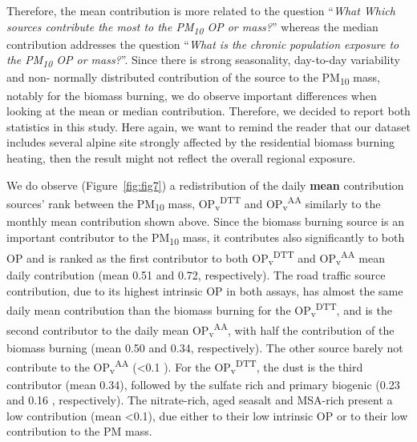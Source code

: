 \documentclass[acp]{copernicus}
\begin{document}
Therefore, the mean contribution is more related to the question
``\emph{What Which sources contribute the most to the
PM\textsubscript{10} OP or mass?}'' whereas the median contribution
addresses the question ``\emph{What is the} \emph{chronic}
\emph{population exposure to the PM\textsubscript{10} OP or mass?}''.
Since there is strong seasonality, day-to-day variability and non-
normally distributed contribution of the source to the
PM\textsubscript{10} mass, notably for the biomass burning, we do
observe important differences when looking at the mean or median
contribution. Therefore, we decided to report both statistics in this
study. Here again, we want to remind the reader that our dataset
includes several alpine site strongly affected by the residential
biomass burning heating, then the result might not reflect the overall
regional exposure.

We do observe (Figure~\ref{fig:fig7}) a
redistribution of the daily \textbf{mean} contribution sources' rank
between the PM\textsubscript{10} mass,
OP\textsubscript{v}\textsuperscript{DTT} and
OP\textsubscript{v}\textsuperscript{AA} similarly to the monthly mean
contribution shown above. Since the biomass burning source is an
important contributor to the PM\textsubscript{10} mass, it contributes
also significantly to both OP and is ranked as the first contributor to
both OP\textsubscript{v}\textsuperscript{DTT} and
OP\textsubscript{v}\textsuperscript{AA} mean daily contribution (mean
0.51 and 0.72, respectively). The road traffic source contribution, due
to its highest intrinsic OP in both assays, has almost the same daily
mean contribution than the biomass burning for the
OP\textsubscript{v}\textsuperscript{DTT}, and is the second contributor
to the daily mean OP\textsubscript{v}\textsuperscript{AA}, with half the
contribution of the biomass burning (mean 0.50 and 0.34, respectively).
The other source barely not contribute to the
OP\textsubscript{v}\textsuperscript{AA} (\textless0.1 ). For the
OP\textsubscript{v}\textsuperscript{DTT}, the dust is the third
contributor (mean 0.34), followed by the sulfate rich and primary
biogenic (0.23 and 0.16 , respectively). The nitrate-rich, aged seasalt
and MSA-rich present a low contribution (mean \textless0.1), due either
to their low intrinsic OP or to their low contribution to the PM mass.
\end{document}
